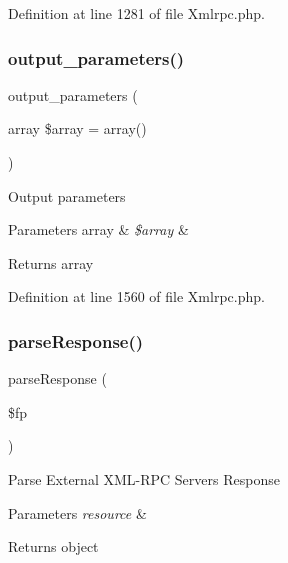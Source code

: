 Definition at line 1281 of file Xmlrpc.\+php.

\mbox{\label{class_x_m_l___r_p_c___message_a763d97af7e5ff17493db7ecbd1064ba9}} 
\subsubsection{\texorpdfstring{output\_parameters()}{output\_parameters()}}
{\footnotesize\ttfamily output\+\_\+parameters (\begin{DoxyParamCaption}\item[{array}]{\$array = {\ttfamily array()} }\end{DoxyParamCaption})}

Output parameters


\begin{DoxyParams}[1]{Parameters}
array & {\em \$array} & \\
\hline
\end{DoxyParams}
\begin{DoxyReturn}{Returns}
array 
\end{DoxyReturn}


Definition at line 1560 of file Xmlrpc.\+php.

\mbox{\label{class_x_m_l___r_p_c___message_ab1b93386615fce804baf236bf660a646}} 
\subsubsection{\texorpdfstring{parseResponse()}{parseResponse()}}
{\footnotesize\ttfamily parse\+Response (\begin{DoxyParamCaption}\item[{}]{\$fp }\end{DoxyParamCaption})}

Parse External X\+M\+L-\/\+R\+PC Server\textquotesingle{}s Response


\begin{DoxyParams}{Parameters}
{\em resource} & \\
\hline
\end{DoxyParams}
\begin{DoxyReturn}{Returns}
object 
\end{DoxyReturn}


